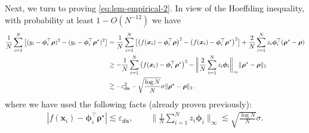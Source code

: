 \documentclass[english]{article}
\begin{document}
Next, we turn to proving  \eqref{eq:lem-empirical-2}.
In view of the Hoeffding inequality, with probability at least $1-O(N^{-12})$ we have
%
\begin{align*}
\frac{1}{N}\sum_{i = 1}^N \big[(y_i - {\bm \phi}_i^{\top}{\bm \rho})^2 - (y_i - {\bm \phi}_i^{\top}{\bm \rho}^{\star})^2\big] 
&=\frac{1}{N}\sum_{i = 1}^N \big[\big(f({\bm x}_i) - {\bm \phi}_i^{\top}{\bm \rho}\big)^2 - \big(f({\bm x}_i) - {\bm \phi}_i^{\top}{\bm \rho}^{\star}\big)^2\big] + \frac{2}{N}\sum_{i = 1}^N z_i{\bm \phi}_i^{\top}({\bm \rho}^{\star}- {\bm \rho})\notag\\
&\ge- \frac1N\sum_{i=1}^N\big(f({\bm x}_i) - {\bm \phi}_i^{\top}{\bm \rho}^{\star}\big)^2
- \bigg\|\frac{2}{N}\sum_{i = 1}^N z_i{\bm \phi}_i\bigg\|_{\infty}\|{\bm \rho}^{\star}- {\bm \rho}\|_1\notag\\
&\gtrsim -\varepsilon_{\mathsf{dis}}^2 -\sqrt{\frac{\log N}{N}}\sigma\|{\bm \rho}^{\star}-{\bm \rho}\|_1. 
\end{align*}
%
where we have used the following facts (already proven previously): 
%
\begin{align*}
|f({\bm x}_i) - {\bm \phi}_i^{\top}{\bm \rho}^{\star}|\lesssim \varepsilon_{\mathsf{dis}},\qquad
\bigg\|\frac1N\sum_{i = 1}^N z_i{\bm \phi}_i\bigg\|_{\infty}\lesssim \sqrt{\frac{\log N}{N}}\sigma.
\end{align*}
\end{document}
